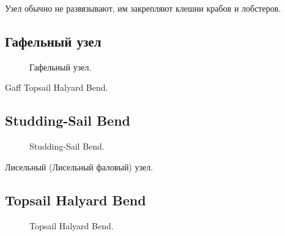 Узел обычно не развязывают, им закрепляют клешни крабов и лобстеров.

\subsection{Гафельный узел}

\begin{figure}[H]\centering
	\begin{minipage}{1\linewidth}
		\begin{center}
			\tcbox[enhanced jigsaw,colframe=black,opacityframe=0.5,opacityback=0.5]
			{\centering{}}
		\end{center}
	\end{minipage}
\caption{Гафельный узел.}
\label{ris:Gaff_Topsail_Halyard_Bend}
\end{figure}

Gaff Topsail Halyard Bend.

\subsection{Studding-Sail Bend}

\begin{figure}[H]\centering
	\begin{minipage}{1\linewidth}
		\begin{center}
			\tcbox[enhanced jigsaw,colframe=black,opacityframe=0.5,opacityback=0.5]
			{\centering{}}
		\end{center}
	\end{minipage}
\caption{Studding-Sail Bend.}
\label{ris:Studding-Sail_Bend}
\end{figure}

Лисельный (Лисельный фаловый) узел.

\subsection{Topsail Halyard Bend}

\begin{figure}[H]\centering
\hfil
	\caption{Topsail Halyard Bend.}\label{ris:Topsail_Halyard_Bend}
\end{figure}

